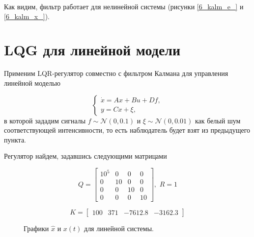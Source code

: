 Как видим, фильтр работает для нелинейной системы (рисунки \ref{6_kalm_e_} и \ref{6_kalm_x_}).

\section{LQG для линейной модели}
Применим LQR-регулятор совместно с фильтром Калмана для управления линейной моделью

\begin{equation}
	\begin{cases}
\dot{x} = Ax + Bu + Df,\\
y = Cx + \xi,
	\end{cases}
\end{equation}
в которой зададим сигналы $f \sim \mathcal{N} (0, 0.1)$ и $\xi\sim \mathcal{N} (0, 0.01)$ как белый шум соответствующей интенсивности, то есть наблюдатель будет взят из предыдущего пункта. 

Регулятор найдем, задавшись следующими матрицами

\begin{equation}
	Q = \begin{bmatrix}
		10^5 & 0 & 0 & 0\\
		0 & 10 & 0 & 0\\
		0 & 0 & 10 & 0\\
		0 & 0 & 0 & 10
	\end{bmatrix}, \, \, R=1
\end{equation}

\begin{equation}
K= \begin{bmatrix}
	100&371&-7612.8&-3162.3
\end{bmatrix}
\end{equation}

\begin{figure}[!h]
	\caption{Графики $\hat{x}$ и $x(t)$ для линейной системы.}
	\label{6_lqg_lin2}
\end{figure}

